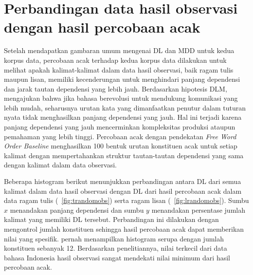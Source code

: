 \section{Perbandingan data hasil observasi dengan hasil percobaan acak}
Setelah mendapatkan gambaran umum mengenai DL dan MDD untuk kedua korpus data, percobaan acak terhadap kedua korpus data dilakukan untuk melihat apakah kalimat-kalimat dalam data hasil observasi, baik ragam tulis maupun lisan, memiliki kecenderungan untuk menghindari panjang dependensi dan jarak tautan dependensi yang lebih jauh. Berdasarkan hipotesis DLM, \cite{futrell2015large} mengajukan bahwa jika bahasa berevolusi untuk mendukung komunikasi yang lebih mudah, seharusnya urutan kata yang dimanfaatkan penutur dalam tuturan nyata tidak menghasilkan panjang dependensi yang jauh. Hal ini terjadi karena panjang dependensi yang jauh mencerminkan kompleksitas produksi ataupun pemahaman yang lebih tinggi. Percobaan acak dengan pendekatan \textit{Free Word Order Baseline} menghasilkan 100 bentuk urutan konstituen acak untuk setiap kalimat dengan mempertahankan struktur tautan-tautan dependensi yang sama dengan kalimat dalam data observasi. 

Beberapa histogram berikut menunjukkan perbandingan antara DL dari semua kalimat dalam data hasil observasi dengan DL dari hasil percobaan acak dalam data ragam tulis (\pic~\ref{fig:trandomobs}) serta ragam lisan (\pic~\ref{fig:lrandomobs}). Sumbu $x$ menandakan panjang dependensi dan sumbu $y$ menandakan persentase jumlah kalimat yang memiliki DL tersebut. Perbandingan ini dilakukan dengan mengontrol jumlah konstituen sehingga hasil percobaan acak dapat memberikan nilai yang spesifik. \cite{futrell2015large} pernah menampilkan histogram serupa dengan jumlah konstituen sebanyak 12. Berdasarkan penelitiannya, nilai terkecil dari data bahasa Indonesia hasil observasi sangat mendekati nilai minimum dari hasil percobaan acak.

